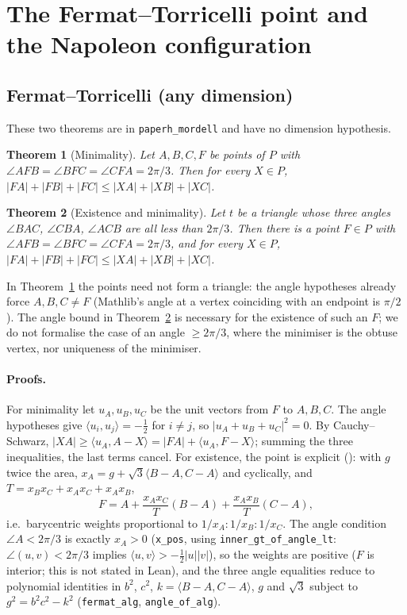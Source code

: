 \documentclass[11pt]{article}
\newtheorem{theorem}{Theorem}
\theoremstyle{definition}
\theoremstyle{remark}
\newcommand{\lean}[1]{\texttt{#1}}
\begin{document}
\section{The Fermat--Torricelli point and the Napoleon configuration}\label{sec:fermat}
\subsection{Fermat--Torricelli (any dimension)}
These two theorems are in \lean{paperh\_mordell} and have no dimension hypothesis.
\begin{theorem}[Minimality]\label{thm:fermatmin}
Let $A,B,C,F$ be points of $P$ with $\angle AFB=\angle BFC=\angle CFA=2\pi/3$. Then for every
$X\in P$, $|FA|+|FB|+|FC|\le|XA|+|XB|+|XC|$.
\end{theorem}
\begin{theorem}[Existence and minimality]\label{thm:fermat}
Let $t$ be a triangle whose three angles $\angle BAC$, $\angle CBA$, $\angle ACB$ are all less than
$2\pi/3$. Then there is a point $F\in P$ with $\angle AFB=\angle BFC=\angle CFA=2\pi/3$, and for every
$X\in P$, $|FA|+|FB|+|FC|\le|XA|+|XB|+|XC|$.
\end{theorem}
In Theorem~\ref{thm:fermatmin} the points need not form a triangle: the angle hypotheses already
force $A,B,C\ne F$ (Mathlib's angle at a vertex coinciding with an endpoint is $\pi/2$). The angle
bound in Theorem~\ref{thm:fermat} is necessary for the existence of such an $F$; we do not formalise
the case of an angle $\ge 2\pi/3$, where the minimiser is the obtuse vertex, nor uniqueness of
the minimiser.

\paragraph{Proofs.} For minimality let $u_A,u_B,u_C$ be the unit vectors from $F$ to $A,B,C$. The
angle hypotheses give $\langle u_i,u_j\rangle=-\tfrac12$ for $i\ne j$, so $|u_A+u_B+u_C|^2=0$. By
Cauchy--Schwarz, $|XA|\ge\langle u_A,A-X\rangle=|FA|+\langle u_A,F-X\rangle$; summing the three
inequalities, the last terms cancel. For existence, the point is explicit
(): with $g$ twice the area, $x_A=g+\sqrt3\langle B-A,C-A\rangle$
and cyclically, and $T=x_Bx_C+x_Ax_C+x_Ax_B$,
\[
F=A+\frac{x_Ax_C}{T}(B-A)+\frac{x_Ax_B}{T}(C-A),
\]
i.e.\ barycentric weights proportional to $1/x_A:1/x_B:1/x_C$. The angle condition $\angle A<2\pi/3$
is exactly $x_A>0$ (\lean{x\_pos}, using \lean{inner\_gt\_of\_angle\_lt}: $\angle(u,v)<2\pi/3$ implies
$\langle u,v\rangle>-\tfrac12|u||v|$), so the weights are positive ($F$ is interior; this is not stated in Lean), and the three angle
equalities reduce to polynomial identities in $b^2$, $c^2$, $k=\langle B-A,C-A\rangle$, $g$ and
$\sqrt3$ subject to $g^2=b^2c^2-k^2$ (\lean{fermat\_alg}, \lean{angle\_of\_alg}).
\end{document}
